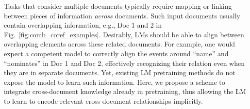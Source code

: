 \documentclass[11pt,a4paper]{article}
\begin{document}
Tasks that consider multiple documents typically require mapping or linking between pieces of information \emph{across} documents. Such input documents usually contain overlapping information, e.g., Doc 1 and 2 in Fig.~\ref{fig:comb_coref_examples}. Desirably, LMs should be able to align between overlapping elements across these related documents. For example, one would expect a competent model to correctly align the events around ``name'' and ``nominates'' in Doc 1 and Doc 2, effectively recognizing their relation even when they are in separate documents. Yet, existing LM pretraining methods do not expose the model to learn such information. Here, we propose a scheme to integrate cross-document knowledge already in pretraining, thus allowing the LM to learn to encode relevant cross-document relationships implicitly.
\end{document}
